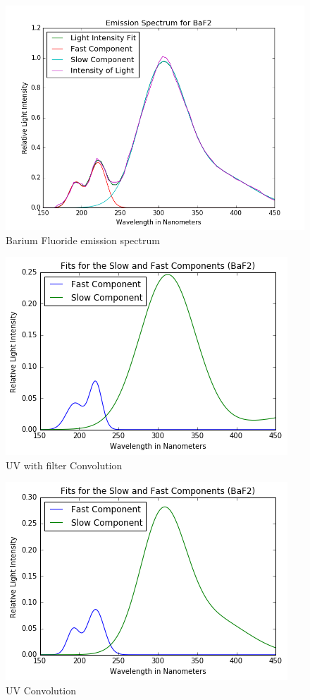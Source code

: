 \begin{figure}
  \centering
    \includegraphics[width=.8\columnwidth]{FitsBaF2.png}
  \caption{Barium Fluoride emission spectrum}
  \label{fig:FitsBaF2}
\end{figure} 

\begin{figure}
  \centering
    \includegraphics[width=.8\columnwidth]{convf.png}
  \caption{UV with filter Convolution}
  \label{fig:convf}
\end{figure} 

\begin{figure}
  \centering
    \includegraphics[width=.8\columnwidth]{convuv.png}
  \caption{UV Convolution}
  \label{fig:convuv}
\end{figure} 

